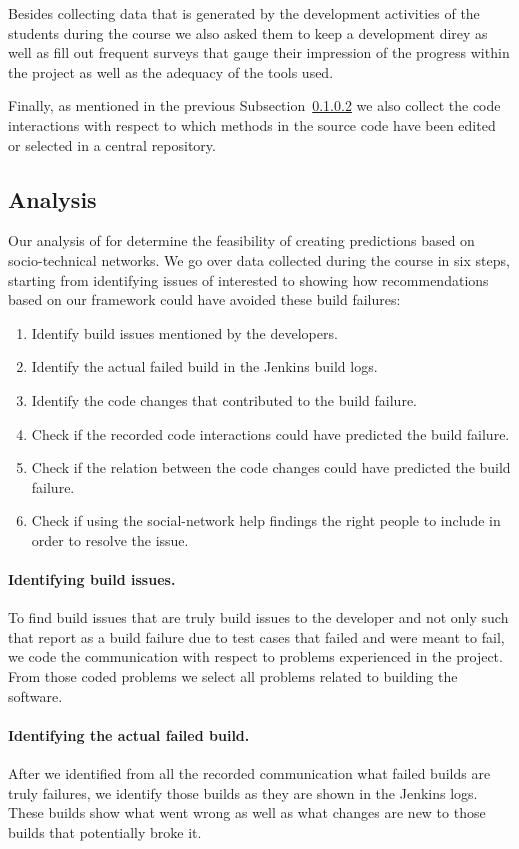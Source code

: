 Besides collecting data that is generated by the development activities of the students during the course we also asked them to keep a development direy as well as fill out frequent surveys that gauge their impression of the progress within the project as well as the adequacy of the tools used.

Finally, as mentioned in the previous Subsection~\ref{} we also collect the code interactions with respect to which methods in the source code have been edited or selected in a central repository.

\subsection{Analysis}
Our analysis of for determine the feasibility of creating predictions based on socio-technical networks.
We go over data collected during the course in six steps, starting from identifying issues of interested to showing how recommendations based on our framework could have avoided these build failures:

\begin{enumerate}
\item Identify build issues mentioned by the developers.
\item Identify the actual failed build in the Jenkins build logs.
\item Identify the code changes that contributed to the build failure.
\item Check if the recorded code interactions could have predicted the build failure.
\item Check if the relation between the code changes could have predicted the build failure.
\item Check if using the social-network help findings the right people to include in order to resolve the issue.
\end{enumerate}

\paragraph{Identifying build issues.}
To find build issues that are truly build issues to the developer and not only such that report as a build failure due to test cases that failed and were meant to fail, we code the communication with respect to problems experienced in the project.
From those coded problems we select all problems related to building the software.

\paragraph{Identifying the actual failed build.}
After we identified from all the recorded communication what failed builds are truly failures, we identify those builds as they are shown in the Jenkins logs.
These builds show what went wrong as well as what changes are new to those builds that potentially broke it.

